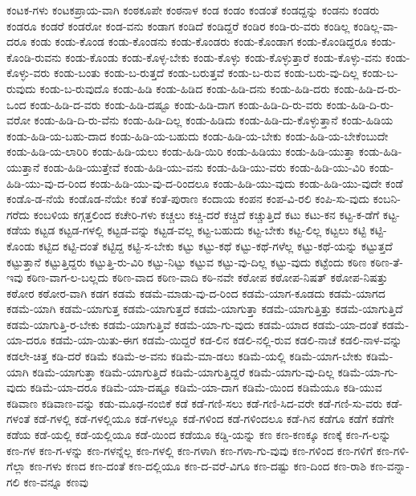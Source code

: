 {ಕಂಟಕ-ಗಳು
ಕಂಟಕಪ್ರಾಯ-ವಾಗಿ
ಕಂಠಕೂಪೇ
ಕಂಠನಾಳ
ಕಂಡ
ಕಂಡಂ
ಕಂಡಂತೆ
ಕಂಡದ್ದನ್ನು
ಕಂಡನು
ಕಂಡರು
ಕಂಡರೂ
ಕಂಡರೆ
ಕಂಡರೋ
ಕಂಡ-ವನು
ಕಂಡಾಗ
ಕಂಡಿದೆ
ಕಂಡಿದ್ದರೆ
ಕಂಡಿರ
ಕಂಡಿ-ರು-ವರು
ಕಂಡಿಲ್ಲ
ಕಂಡಿಲ್ಲ-ವಾ-ದರೂ
ಕಂಡು
ಕಂಡು-ಕೊಂಡ
ಕಂಡು-ಕೊಂಡನು
ಕಂಡು-ಕೊಂಡರು
ಕಂಡು-ಕೊಂಡಾಗ
ಕಂಡು-ಕೊಂಡಿದ್ದರೂ
ಕಂಡು-ಕೊಂಡಿ-ರುವನು
ಕಂಡು-ಕೊಂಡು
ಕಂಡು-ಕೊಳ್ಳ-ಬೇಕು
ಕಂಡು-ಕೊಳ್ಳು
ಕಂಡು-ಕೊಳ್ಳುತ್ತಾರೆ
ಕಂಡು-ಕೊಳ್ಳು-ವನು
ಕಂಡು-ಕೊಳ್ಳು-ವರು
ಕಂಡು-ಬಂತು
ಕಂಡು-ಬ-ರುತ್ತದೆ
ಕಂಡು-ಬರುತ್ತವೆ
ಕಂಡು-ಬ-ರುವ
ಕಂಡು-ಬರು-ವು-ದಿಲ್ಲ
ಕಂಡು-ಬ-ರುವುದು
ಕಂಡು-ಬ-ರುವುದೊ
ಕಂಡು-ಹಿಡಿ
ಕಂಡು-ಹಿಡಿದ
ಕಂಡು-ಹಿಡಿ-ದನು
ಕಂಡು-ಹಿಡಿ-ದರು
ಕಂಡು-ಹಿಡಿ-ದ-ರು-ಒಂದ
ಕಂಡು-ಹಿಡಿ-ದ-ವರು
ಕಂಡು-ಹಿಡಿ-ದಷ್ಟೂ
ಕಂಡು-ಹಿಡಿ-ದಾಗ
ಕಂಡು-ಹಿಡಿ-ದಿ-ರು-ವರು
ಕಂಡು-ಹಿಡಿ-ದಿ-ರು-ವರೋ
ಕಂಡು-ಹಿಡಿ-ದಿ-ರು-ವೆನು
ಕಂಡು-ಹಿಡಿ-ದಿಲ್ಲ
ಕಂಡು-ಹಿಡಿದು
ಕಂಡು-ಹಿಡಿ-ದು-ಕೊಳ್ಳುತ್ತಾನೆ
ಕಂಡು-ಹಿಡಿಯ
ಕಂಡು-ಹಿಡಿ-ಯ-ಬಹು-ದಾದ
ಕಂಡು-ಹಿಡಿ-ಯ-ಬಹುದು
ಕಂಡು-ಹಿಡಿ-ಯ-ಬೇಕು
ಕಂಡು-ಹಿಡಿ-ಯ-ಬೇಕೆಂಬುದೇ
ಕಂಡು-ಹಿಡಿ-ಯ-ಲಾರಿರಿ
ಕಂಡು-ಹಿಡಿ-ಯಲು
ಕಂಡು-ಹಿಡಿ-ಯಿರಿ
ಕಂಡು-ಹಿಡಿಯು
ಕಂಡು-ಹಿಡಿ-ಯುತ್ತಾ
ಕಂಡು-ಹಿಡಿ-ಯುತ್ತಾನೆ
ಕಂಡು-ಹಿಡಿ-ಯುತ್ತೇವೆ
ಕಂಡು-ಹಿಡಿ-ಯು-ವನು
ಕಂಡು-ಹಿಡಿ-ಯು-ವರು
ಕಂಡು-ಹಿಡಿ-ಯು-ವಿರಿ
ಕಂಡು-ಹಿಡಿ-ಯು-ವು-ದ-ರಿಂದ
ಕಂಡು-ಹಿಡಿ-ಯು-ವು-ದ-ರಿಂದಲೂ
ಕಂಡು-ಹಿಡಿ-ಯು-ವುದು
ಕಂಡು-ಹಿಡಿ-ಯು-ವುದೇ
ಕಂಡೆ
ಕಂಡೊ-ಡ-ನೆಯೆ
ಕಂಡೊಡ-ನೆಯೇ
ಕಂತೆ
ಕಂತೆ-ಪುರಾಣ
ಕಂದಾಯ
ಕಂಪನ
ಕಂಪ-ವಿ-ರಲಿ
ಕಂಪಿ-ಸು-ವುದು
ಕಂಬನಿ-ಗರೆದು
ಕಂಬಳಿಯ
ಕಗ್ಗತ್ತಲಿಂದ
ಕಚೇರಿ-ಗಳು
ಕಚ್ಚಲು
ಕಚ್ಚಿ-ದರೆ
ಕಚ್ಚಿದೆ
ಕಚ್ಚುತ್ತಿದೆ
ಕಟು
ಕಟು-ಕನ
ಕಟ್ಟ-ಕ-ಡೆಗೆ
ಕಟ್ಟ-ಕಡೆಯ
ಕಟ್ಟಡ
ಕಟ್ಟಡ-ಗಳಲ್ಲಿ
ಕಟ್ಟಡ-ವನ್ನು
ಕಟ್ಟಡ-ವಲ್ಲ
ಕಟ್ಟ-ಬಹುದು
ಕಟ್ಟ-ಬೇಕು
ಕಟ್ಟ-ಲಿಲ್ಲ
ಕಟ್ಟಲು
ಕಟ್ಟಿ
ಕಟ್ಟಿ-ಕೊಂಡು
ಕಟ್ಟಿದ
ಕಟ್ಟಿ-ದಂತೆ
ಕಟ್ಟಿದ್ದ
ಕಟ್ಟಿ-ಸ-ಬೇಕು
ಕಟ್ಟು
ಕಟ್ಟು-ಕಥೆ
ಕಟ್ಟು-ಕಥೆ-ಗಳೆಲ್ಲ
ಕಟ್ಟು-ಕಥೆ-ಯನ್ನು
ಕಟ್ಟುತ್ತದೆ
ಕಟ್ಟುತ್ತಾನೆ
ಕಟ್ಟುತ್ತಿದ್ದರು
ಕಟ್ಟುತ್ತಿ-ರು-ವಿರಿ
ಕಟ್ಟು-ನಿಟ್ಟು
ಕಟ್ಟುವ
ಕಟ್ಟು-ವು-ದಿಲ್ಲ
ಕಟ್ಟು-ವುದು
ಕಟ್ಟೆಂದು
ಕಠಿಣ
ಕಠಿಣ-ತೆ-ಇವು
ಕಠಿಣ-ವಾಗ-ಲ-ಬಲ್ಲದು
ಕಠಿಣ-ವಾದ
ಕಠಿಣ-ವಾದಿ
ಕಠಿ-ನವೇ
ಕಠೋಪ
ಕಠೋಪ-ನಿಷತ್
ಕಠೋಪ-ನಿಷತ್ತು
ಕಠೋರ
ಕಠೋರ-ವಾಗಿ
ಕಡಗ
ಕಡಮೆ
ಕಡಮೆ-ಮಾಡು-ವು-ದ-ರಿಂದ
ಕಡಮೆ-ಯಾಗ-ಕೂಡದು
ಕಡಮೆ-ಯಾಗದ
ಕಡಮೆ-ಯಾಗಿ
ಕಡಮೆ-ಯಾಗುತ್ತ
ಕಡಮೆ-ಯಾಗುತ್ತದೆ
ಕಡಮೆ-ಯಾಗುತ್ತಾ
ಕಡಮೆ-ಯಾಗುತ್ತಿತ್ತು
ಕಡಮೆ-ಯಾಗುತ್ತಿದೆ
ಕಡಮೆ-ಯಾಗುತ್ತಿ-ರ-ಬೇಕು
ಕಡಮೆ-ಯಾಗುತ್ತಿವೆ
ಕಡಮೆ-ಯಾ-ಗು-ವುದು
ಕಡಮೆ-ಯಾದ
ಕಡಮೆ-ಯಾ-ದಂತೆ
ಕಡಮೆ-ಯಾ-ದರೂ
ಕಡಮೆ-ಯಾ-ಯಿತು-ಈಗ
ಕಡಮೆ-ಯಿದ್ದರೆ
ಕಡ-ಲಿನ
ಕಡಲಿ-ನಲ್ಲಿ-ರುವ
ಕಡಲಿ-ನಾಚೆ
ಕಡಲಿ-ನಾಳ-ವನ್ನು
ಕಡಲೇ-ಚಿತ್ತ
ಕಡಿ-ದರೆ
ಕಡಿಮೆ
ಕಡಿಮೆ-ಅ-ವನು
ಕಡಿಮೆ-ಮಾ-ಡಲು
ಕಡಿಮೆ-ಯಲ್ಲಿ
ಕಡಿಮೆ-ಯಾಗ-ಬೇಕು
ಕಡಿಮೆ-ಯಾಗಿ
ಕಡಿಮೆ-ಯಾಗುತ್ತಾ
ಕಡಿಮೆ-ಯಾಗುತ್ತಿದೆ
ಕಡಿಮೆ-ಯಾಗುತ್ತಿದ್ದರೆ
ಕಡಿಮೆ-ಯಾಗು-ವು-ದಿಲ್ಲ
ಕಡಿಮೆ-ಯಾ-ಗು-ವುದು
ಕಡಿಮೆ-ಯಾ-ದರೂ
ಕಡಿಮೆ-ಯಾ-ದಷ್ಟೂ
ಕಡಿಮೆ-ಯಾ-ದಾಗ
ಕಡಿಮೆ-ಯಿಂದ
ಕಡಿಮೆಯೂ
ಕಡಿ-ಯುವ
ಕಡಿವಾಣ
ಕಡಿವಾಣ-ವನ್ನು
ಕಡು-ಮೂಢ-ನಂಬಿಕೆ
ಕಡೆ
ಕಡೆ-ಗಣಿ-ಸಲು
ಕಡೆ-ಗಣಿ-ಸಿದ-ವರೇ
ಕಡೆ-ಗಣಿ-ಸು-ವರು
ಕಡೆ-ಗಳಂತೆ
ಕಡೆ-ಗಳಲ್ಲಿ
ಕಡೆ-ಗಳಲ್ಲಿಯೂ
ಕಡೆ-ಗಳಲ್ಲೂ
ಕಡೆ-ಗಳಿಂದ
ಕಡೆ-ಗಳಿಂದಲೂ
ಕಡೆ-ಗಿನ
ಕಡೆಗೂ
ಕಡೆಗೆ
ಕಡೆಗೇ
ಕಡೆಯ
ಕಡೆ-ಯಲ್ಲಿ
ಕಡೆ-ಯಲ್ಲಿಯೂ
ಕಡೆ-ಯಿಂದ
ಕಡೆಯೂ
ಕಡ್ಡಿ-ಯನ್ನು
ಕಣ
ಕಣ-ಕಣಕ್ಕೂ
ಕಣಕ್ಕೆ
ಕಣ-ಗ-ಲನ್ನು
ಕಣ-ಗಳ
ಕಣ-ಗ-ಳನ್ನು
ಕಣ-ಗಳನ್ನೆಲ್ಲ
ಕಣ-ಗಳಲ್ಲಿ
ಕಣ-ಗಳಾಗಿ
ಕಣ-ಗಳಾ-ಗು-ವುವು
ಕಣ-ಗಳಿಂದ
ಕಣ-ಗಳಿಗೆ
ಕಣ-ಗಳಿ-ಗೆಲ್ಲಾ
ಕಣ-ಗಳು
ಕಣದ
ಕಣ-ದಂತೆ
ಕಣ-ದಲ್ಲಿಯೂ
ಕಣ-ದ-ವರೆ-ವಿಗೂ
ಕಣ-ದಷ್ಟು
ಕಣ-ದಿಂದ
ಕಣ-ರಾಶಿ
ಕಣ-ವನ್ನಾ-ಗಲಿ
ಕಣ-ವನ್ನೂ
ಕಣವು
}
